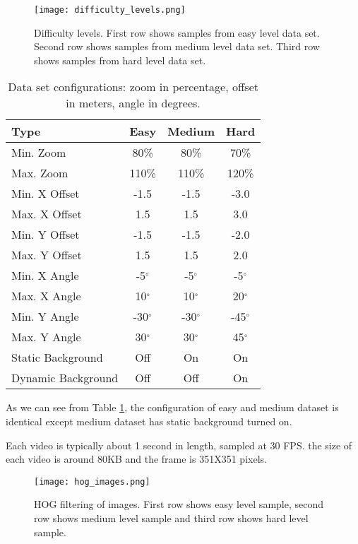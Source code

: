 \documentclass[
	a4paper, %
	10pt, %
	unnumberedsections, %
	twoside, %
]{t0004}
\begin{document}
\begin{figure}
	\texttt{[image: difficulty\_levels.png]}
	\caption{Difficulty levels. First row shows samples from easy level data set. Second row shows samples from medium level data set. Third row shows samples from hard level data set.}
	\label{fig:difficultylevels}
\end{figure}

\begin{table} %
	\caption{Data set configurations: zoom in percentage, offset in meters, angle in degrees.}
	\centering
	\begin{tabular}{lccc}
		\toprule
		Type & Easy & Medium & Hard  \\
		\midrule
		Min. Zoom & 80\% & 80\% & 70\% \\
		Max. Zoom & 110\% &  110\% & 120\%  \\
		\hline
		Min. X Offset & -1.5 & -1.5 & -3.0 \\
		Max. X Offset &  1.5 & 1.5 & 3.0 \\
		\hline
		Min. Y Offset & -1.5 & -1.5 & -2.0 \\
		Max. Y Offset &  1.5 & 1.5 & 2.0 \\
		\hline
		Min. X Angle & -5$^{\circ}$ & -5$^{\circ}$ & -5$^{\circ}$ \\
		Max. X Angle & 10$^{\circ}$ & 10$^{\circ}$ & 20$^{\circ}$ \\
		\hline
		Min. Y Angle & -30$^{\circ}$ & -30$^{\circ}$ & -45$^{\circ}$ \\
		Max. Y Angle & 30$^{\circ}$ & 30$^{\circ}$ & 45$^{\circ}$ \\
		\hline
		Static Background & Off & On & On \\
		Dynamic Background & Off & Off & On \\
		\bottomrule
	\end{tabular}
	\label{tab:dataconfig}
\end{table}

As we can see from Table \ref{tab:dataconfig}, the configuration of easy and medium dataset is identical except medium dataset has static background turned on.

Each video is typically about 1 second in length, sampled at 30 FPS. the size of each video is around 80KB and the frame is 351X351 pixels.

\begin{figure}
	\texttt{[image: hog\_images.png]}
	\caption{HOG filtering of images. First row shows easy level sample, second row shows medium level sample and third row shows hard level sample.}
	\label{fig:hogimages}
\end{figure}
\end{document}
